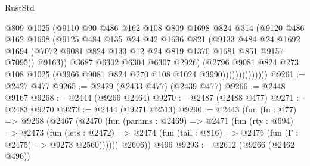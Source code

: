 \begin{lexlean}{RustStd}
\begin{coremodule}
                            @809
                            @1025
                            (@9110
                              @90
                              @486
                              @162
                              @108
                              @809
                              @1698
                              @824
                              @314
                              (@9120
                                @486
                                @162
                                @1698
                                (@9125
                                  @484
                                  @135
                                  @24
                                  @42
                                  @1696
                                  @821
                                  (@9133
                                    @484
                                    @24
                                    @1692
                                    @1694
                                    (@7072
                                      @9081
                                      @824
                                      @133
                                      @12
                                      @24
                                      @819
                                      @1370
                                      @1681
                                      @851
                                      @9157
                                      @7095))
                                  @9163))
                              @3687
                              @6302
                              @6304
                              @6307
                              @2926)
                            (@2796
                              @9081
                              @824
                              @273
                              @108
                              @1025
                              (@3966 @9081 @824 @270 @108 @1024 @3990))))))))))))))
@9261 := @2427 @477
@9265 := @2429 (@2433 @477) (@2439 @477)
@9266 := @2448 @9167
@9268 := @2444 (@9266 @2464)
@9270 := @2487 (@2488 @477)
@9271 := @2483 @9270
@9273 := @2444 (@9271 @2513)
@9290 := @2443
    (fun (fn : @77) =>
    @9268
      (@2467
        (@2470
          (fun (params : @2469) =>
          @2471
            (fun (rty : @694) =>
            @2473
              (fun (lets : @2472) =>
              @2474 (fun (tail : @816) => @2476 (fun (Γ : @2475) => @9273 @2560))))))
        @2606))
    @496
@9293 := @2612 (@9266 (@2462 @496))

\end{coremodule}
\end{lexlean}
